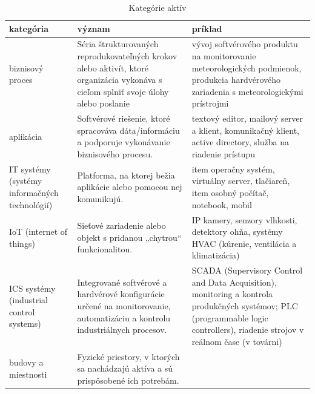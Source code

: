 \begin{table}[h!]
    \caption{Kategórie aktív}
    \label{tab:assetcategory}
    \begin{center}
        \footnotesize
        \begin{tabular}{ |p{}|p{}|p{}| }
            \hline
            kategória & význam & príklad \\
            \hline
            \hline
            biznisový proces
                      &
            Séria štrukturovaných reprodukovateľných krokov alebo aktivít, ktoré organizácia vykonáva s cieľom splniť svoje úlohy alebo poslanie
                      &
            vývoj softvérového produktu na monitorovanie meteorologických podmienok, produkcia hardvérového zariadenia s meteorologickými prístrojmi 
            \\
            \hline
            aplikácia
                      &
            Softvérové riešenie, ktoré spracováva dáta/informáciu a podporuje vykonávanie biznisového procesu.
                      &
            textový editor, mailový server a klient, komunikačný klient, active directory, služba na riadenie prístupu
            \\
            \hline
            IT systémy (systémy informačných technológií)
                      &
            Platforma, na ktorej bežia aplikácie alebo pomocou nej komunikujú.
                      &
            item operačny systém, virtuálny server, tlačiareň, item osobný počítač, notebook, mobil
            \\
            \hline
            IoT (internet of things)
                      &
            Sieťové zariadenie alebo objekt s pridanou „chytrou“ funkcionalitou.
                      &
            IP kamery, senzory vlhkosti, detektory ohňa, systémy HVAC (kúrenie, ventilácia a klimatizácia)
            \\
            \hline
            ICS systémy (industrial control systems)
                      &
            Integrované softvérové a hardvérové konfigurácie určené na monitorovanie, automatizáciu a kontrolu industriálnych procesov.
                      &
            SCADA (Supervisory Control and Data Acquisition), monitoring a kontrola produkčných systémov; PLC (programmable logic controllers), riadenie strojov v reálnom čase (v továrni)
            \\
            \hline
            budovy a miestnosti
                      &
            Fyzické priestory, v ktorých sa nachádzajú aktíva a sú prispôsobené ich potrebám.

\end{tabular}
\end{center}
\end{table}
